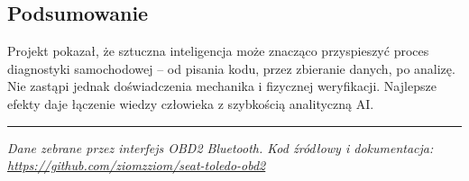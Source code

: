 \documentclass[12pt,a4paper]{article}
\begin{document}
\subsection{Podsumowanie}

Projekt pokazał, że sztuczna inteligencja może znacząco przyspieszyć proces
diagnostyki samochodowej – od pisania kodu, przez zbieranie danych, po analizę.
Nie zastąpi jednak doświadczenia mechanika i fizycznej weryfikacji.
Najlepsze efekty daje łączenie wiedzy człowieka z szybkością analityczną AI.

\vspace{1cm}
\noindent\rule{\textwidth}{0.4pt}
\noindent\small\textit{Dane zebrane przez interfejs OBD2 Bluetooth.
Kod źródłowy i dokumentacja: \url{https://github.com/ziomzziom/seat-toledo-obd2}}
\end{document}
